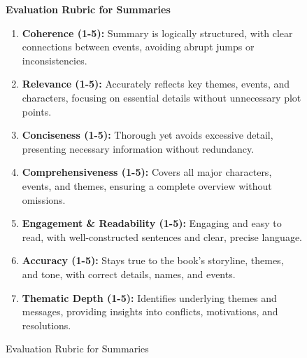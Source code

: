 \begin{figure}[h]
    \centering
    \begin{tcolorbox}[width=\textwidth, colframe=black!50, colback=white, sharp corners]
        \textbf{Evaluation Rubric for Summaries}
        \begin{enumerate}
            \item \textbf{Coherence (1-5):} Summary is logically structured, with clear connections between events, avoiding abrupt jumps or inconsistencies.
            \item \textbf{Relevance (1-5):} Accurately reflects key themes, events, and characters, focusing on essential details without unnecessary plot points.
            \item \textbf{Conciseness (1-5):} Thorough yet avoids excessive detail, presenting necessary information without redundancy.
            \item \textbf{Comprehensiveness (1-5):} Covers all major characters, events, and themes, ensuring a complete overview without omissions.
            \item \textbf{Engagement \& Readability (1-5):} Engaging and easy to read, with well-constructed sentences and clear, precise language.
            \item \textbf{Accuracy (1-5):} Stays true to the book’s storyline, themes, and tone, with correct details, names, and events.
            \item \textbf{Thematic Depth (1-5):} Identifies underlying themes and messages, providing insights into conflicts, motivations, and resolutions.
        \end{enumerate}
    \end{tcolorbox}
    \caption{Evaluation Rubric for Summaries}
    \label{rubric:summary}
\end{figure}




